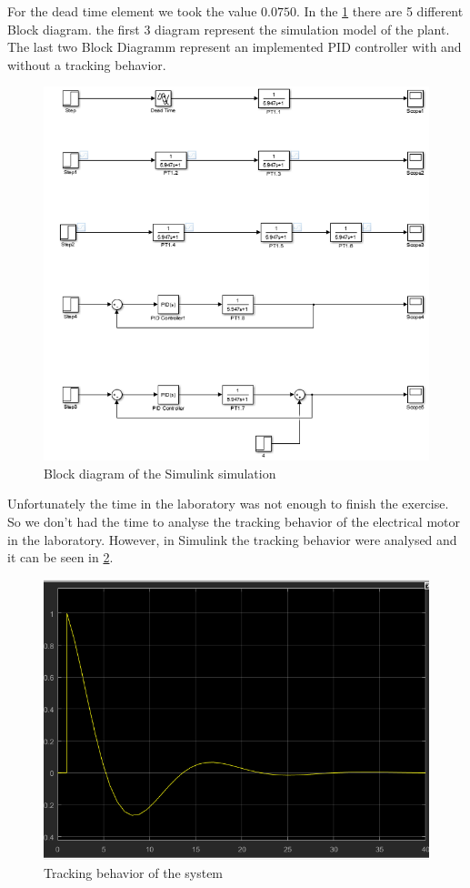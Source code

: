 For   the   dead  time  element  we  took   the   value   $0.0750$.   In   the
\ref{fig:simulink} there are 5 different Block diagram.  the  first  3 diagram
represent  the  simulation  model  of  the  plant. The last two Block Diagramm
represent an implemented PID controller  with and without a tracking behavior.

\begin{figure}
    \centering
    \includegraphics[width=\linewidth]{images/simulink.png}
    \caption{Block diagram of the Simulink simulation}
    \label{fig:simulink}
\end{figure}

Unfortunately  the  time in the  laboratory  was  not  enough  to  finish  the
exercise. So we don't had the time to analyse  the  tracking  behavior  of the
electrical motor in the laboratory. However, in Simulink the tracking behavior
were analysed and it can be seen in \ref{fig:tracking}.

\begin{figure}[h!]
    \centering
    \includegraphics[width=\linewidth]{images/slope_tracking.png}
    \caption{Tracking behavior of the system}
    \label{fig:tracking}
\end{figure}

